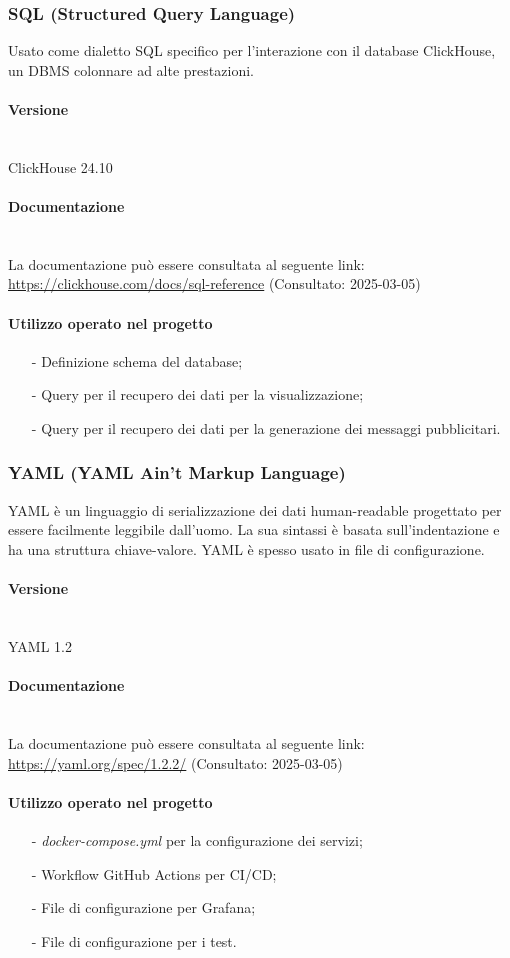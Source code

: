\documentclass[10pt]{article}
\newcommand{\myparagraph}[1]{\paragraph{#1}\mbox{}\\\vspace{0.4em}}
\begin{document}
\begin{justify}
    \subsubsection{SQL (Structured Query Language)}
    Usato come dialetto SQL specifico per l'interazione con il database ClickHouse, un DBMS colonnare ad alte prestazioni.
        \myparagraph{Versione}
            ClickHouse 24.10
        \myparagraph{Documentazione}
            La documentazione può essere consultata al seguente link: \textcolor{blue}{\url{https://clickhouse.com/docs/sql-reference}} (Consultato: 2025-03-05)
        \paragraph{Utilizzo operato nel progetto}
            \begin{itemize}
                \item[-] Definizione schema del database;
                \item[-] Query per il recupero dei dati per la visualizzazione;
                \item[-] Query per il recupero dei dati per la generazione dei messaggi pubblicitari.
            \end{itemize}

    \subsubsection{YAML (YAML Ain't Markup Language)}
    YAML è un linguaggio di serializzazione dei dati human-readable progettato per essere facilmente leggibile dall'uomo. La sua 
    sintassi è basata sull'indentazione e ha una struttura chiave-valore. YAML è spesso usato in file di configurazione.
        \myparagraph{Versione} 
            YAML 1.2
        \myparagraph{Documentazione}
            La documentazione può essere consultata al seguente link: \textcolor{blue}{\url{https://yaml.org/spec/1.2.2/}} (Consultato: 2025-03-05)
        \paragraph{Utilizzo operato nel progetto}
            \begin{itemize}
                \item[-] \textit{docker-compose.yml} per la configurazione dei servizi;
                \item[-] Workflow GitHub Actions per CI/CD;
                \item[-] File di configurazione per Grafana;
                \item[-] File di configurazione per i test.
            \end{itemize}

\end{justify}
\end{document}
